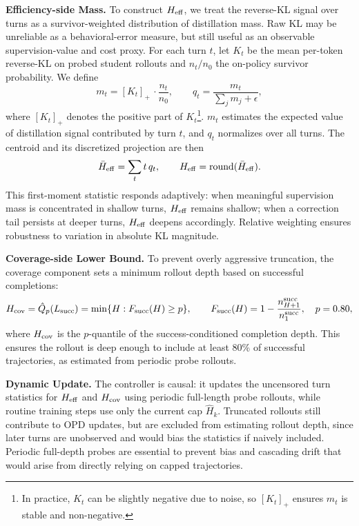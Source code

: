 \textbf{Efficiency-side Mass.} To construct $H_{\mathrm{eff}}$, we treat the reverse-KL signal over turns as a survivor-weighted distribution of distillation mass. Raw KL may be unreliable as a behavioral-error measure, but still useful as an observable supervision-value and cost proxy. For each turn $t$, let $K_t$ be the mean per-token reverse-KL on probed student rollouts and $n_t/n_0$ the on-policy survivor probability. We define
\begin{equation}
m_t = [K_t]_+\,\cdot \frac{n_t}{n_0}, \qquad
q_t = \frac{m_t}{\sum_j m_j + \epsilon},
\end{equation}
where $[K_t]_+$ denotes the positive part of $K_t$\footnote{%
In practice, $K_t$ can be slightly negative due to noise, so $[K_t]_+$ ensures $m_t$ is stable and non-negative.
}.
$m_t$ estimates the expected value of distillation signal contributed by turn $t$, and $q_t$ normalizes over all turns. The centroid and its discretized projection are then
\begin{equation}
\bar H_{\mathrm{eff}} = \sum_t t\,q_t, \qquad
H_{\mathrm{eff}} = \mathrm{round}(\bar H_{\mathrm{eff}}).
\end{equation}
This first-moment statistic responds adaptively: when meaningful supervision mass is concentrated in shallow turns, $H_{\mathrm{eff}}$ remains shallow; when a correction tail persists at deeper turns, $H_{\mathrm{eff}}$ deepens accordingly. Relative weighting ensures robustness to variation in absolute KL magnitude.

\textbf{Coverage-side Lower Bound.} To prevent overly aggressive truncation, the coverage component sets a minimum rollout depth based on successful completions:
\begin{equation}
H_{\mathrm{cov}} = \hat Q_p(L_{\mathrm{succ}}) = \min\{H: F_{\mathrm{succ}}(H)\ge p\}, \qquad
F_{\mathrm{succ}}(H) = 1 - \frac{n^{\mathrm{succ}}_{H+1}}{n^{\mathrm{succ}}_1}, \quad p=0.80,
\end{equation}
where $H_{\mathrm{cov}}$ is the $p$-quantile of the success-conditioned completion depth. This ensures the rollout is deep enough to include at least 80\% of successful trajectories, as estimated from periodic probe rollouts.

\textbf{Dynamic Update.}
The controller is causal: it updates the uncensored turn statistics for $H_{\mathrm{eff}}$ and $H_{\mathrm{cov}}$ using periodic full-length probe rollouts, while routine training steps use only the current cap $\hat H_k$. Truncated rollouts still contribute to OPD updates, but are excluded from estimating rollout depth, since later turns are unobserved and would bias the statistics if naively included. Periodic full-depth probes are essential to prevent bias and cascading drift that would arise from directly relying on capped trajectories. 

